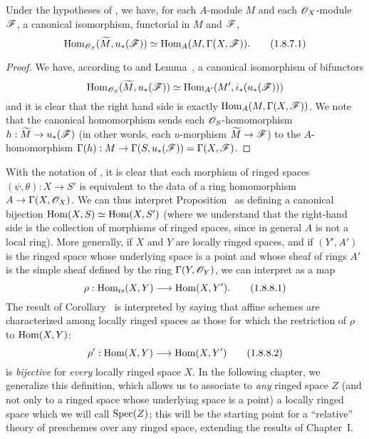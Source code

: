 \begin{corollary}[1.8.7]
\label{1.1.8.7}
Under the hypotheses of , we have, for each $A$-module $M$ and each $\mathscr{O}_X$-module $\mathscr{F}$, a canonical isomorphism, functorial in $M$ and $\mathscr{F}$,
\[
\label{eq:1.1.8.7.1}
  \operatorname{Hom}_{\mathscr{O}_S}(\widetilde{M},u_*(\mathscr{F}))\simeq\operatorname{Hom}_A(M,\Gamma(X,\mathscr{F})).
  \tag{1.8.7.1}
\]
\end{corollary}

\begin{proof}
\label{proof-1.1.8.7}
We have, according to  and Lemma~, a canonical
isomorphism of bifunctors
\[
  \operatorname{Hom}_{\mathscr{O}_S}(\widetilde{M},u_*(\mathscr{F}))\simeq\operatorname{Hom}_{A'}(M',i_*(u_*(\mathscr{F})))
\]
and it is clear that the right hand side is exactly $\operatorname{Hom}_A(M,\Gamma(X,\mathscr{F}))$.
We note that the canonical homomorphism  sends each $\mathscr{O}_S$-homomorphism $h:\widetilde{M}\to u_*(\sh{F})$ (in other words, each $u$-morphism $\widetilde{M}\to\sh{F}$) to the $A$-homomorphism $\Gamma(h):M\to\Gamma(S,u_*(\sh{F}))=\Gamma(X,\sh{F})$.
\end{proof}

\begin{env}[1.8.8]
\label{1.1.8.8}
With the notation of , it is clear  that each morphism of ringed spaces $(\psi,\theta):X\to S'$ is equivalent to the data of a ring homomorphism $A\to\Gamma(X,\sh{O}_X)$.
We can thus interpret Proposition~ as defining a canonical bijection $\operatorname{Hom}(X,S)\simeq\operatorname{Hom}(X,S')$ (where we understand that the right-hand side is the collection of morphisms of ringed spaces, since in general $A$ is not a local ring).
More generally, if $X$ and $Y$ are locally ringed spaces, and if $(Y',A')$ is the ringed space whose underlying space is a point and whose sheaf of rings $A'$ is the simple sheaf defined by the ring $\Gamma(Y,\mathscr{O}_Y)$, we can interpret  as a map
\[
  \label{1.1.8.8.1}
  \rho:\Hom_\text{rs}(X,Y)\to\Hom(X,Y').
  \tag{1.8.8.1}
\]
The result of Corollary~ is interpreted by saying that affine schemes are characterized among locally ringed spaces as those for which the restriction of $\rho$ to
$\operatorname{Hom}(X,Y)$:
\[
  \label{1.1.8.8.2}
  \rho':\Hom(X,Y)\to\Hom(X,Y')
  \tag{1.8.8.2}
\]
is \emph{bijective} for \emph{every} locally ringed space $X$.
In the following chapter, we generalize this definition, which allows us to associate to \emph{any} ringed space $Z$ (and not only to a ringed space whose underlying space is a point) a locally ringed space which we will call $\operatorname{Spec}(Z)$;
this will be the starting point for a ``relative'' theory of preschemes over any ringed space, extending the results of Chapter~I.
\end{env}

